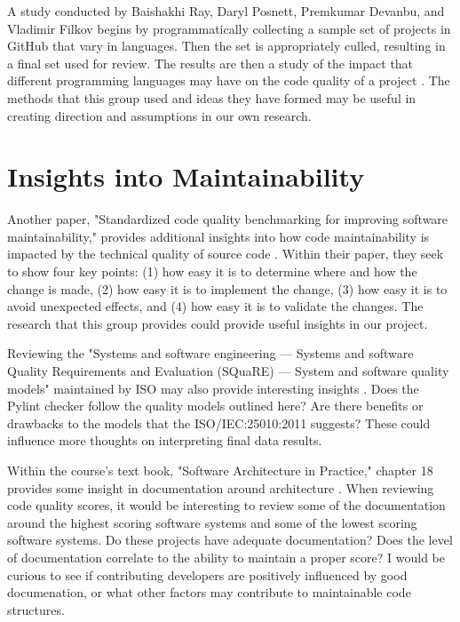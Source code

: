 \documentclass[conference]{IEEEtran}
\begin{document}
A study conducted by Baishakhi Ray, Daryl Posnett, Premkumar Devanbu, and Vladimir Filkov begins by programmatically collecting a sample set of projects in GitHub that vary in languages. Then the set is appropriately culled, resulting in a final set used for review. The results are then a study of the impact that different programming languages may have on the code quality of a project \cite{baishakhi:2017}. The methods that this group used and ideas they have formed may be useful in creating direction and assumptions in our own research.

\section{Insights into Maintainability}

Another paper, "Standardized code quality benchmarking for improving software maintainability," provides additional insights into how code maintainability is impacted by the technical quality of source code \cite{baggen:2012}. Within their paper, they seek to show four key points: (1) how easy it is to determine where and how the change is made, (2) how easy it is to implement the change, (3) how easy it is to avoid unexpected effects, and (4) how easy it is to validate the changes. The research that this group provides could provide useful insights in our project.

Reviewing the "Systems and software engineering — Systems and software Quality Requirements and Evaluation (SQuaRE) — System and software quality models" maintained by ISO may also provide interesting insights \cite{iso/iec:25010:2011}. Does the Pylint checker follow the quality models outlined here? Are there benefits or drawbacks to the models that the ISO/IEC:25010:2011 suggests? These could influence more thoughts on interpreting final data results.

Within the course's text book, "Software Architecture in Practice," chapter 18 provides some insight in documentation around architecture \cite{book:software-architecture-in-practice}. When reviewing code quality scores, it would be interesting to review some of the documentation around the highest scoring software systems and some of the lowest scoring software systems. Do these projects have adequate documentation? Does the level of documentation correlate to the ability to maintain a proper score? I would be curious to see if contributing developers are positively influenced by good documenation, or what other factors may contribute to maintainable code structures.
\end{document}
